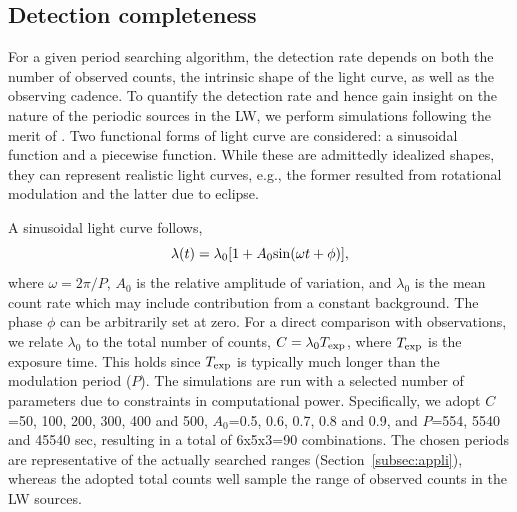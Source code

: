 \documentclass[fleqn,usenatbib]{mnras}
\begin{document}
\subsection{Detection completeness}\label{subsec:simulation}
For a given period searching algorithm, the detection rate depends on both the number of observed counts, the intrinsic shape of the light curve, as well as the observing cadence. 
To quantify the detection rate and hence gain insight on the nature of the periodic sources in the LW, we perform simulations following the merit of \citet{1998ApJ...498..666C}. 
Two functional forms of light curve are considered: a sinusoidal function and a piecewise function. While these are admittedly idealized shapes, they can represent realistic light curves, e.g., the former resulted from rotational modulation and the latter due to eclipse. 

A sinusoidal light curve follows,
\begin{equation}
\lambda (t)=\lambda_0[1+A_{0}{\rm sin}(\omega t+\phi)], 
\label{eqn:sin}
\end{equation}
where $\omega = 2{\pi}/P$, $A_0$ is the relative amplitude of variation, and $\lambda_0$ is the mean count rate which may include contribution from a constant background. The phase $\phi$ can be arbitrarily set at zero.
For a direct comparison with observations, we relate $\lambda_0$ to the total number of counts, $C = \lambda_0 T_{\rm exp}$, where $T_{\rm exp}$ is the exposure time. This holds since $T_{\rm exp}$ is typically much longer than the modulation period ($P$). 
The simulations are run with a selected number of parameters due to constraints in computational power. 
Specifically, we adopt $C$=50, 100, 200, 300, 400 and 500, $A_0$=0.5, 0.6, 0.7, 0.8 and 0.9, and $P$=554, 5540 and 45540 sec, resulting in a total of 6x5x3=90 combinations. 
The chosen periods are representative of the actually searched ranges (Section~\ref{subsec:appli}), whereas
the adopted total counts well sample the range of observed counts in the LW sources.
\end{document}
